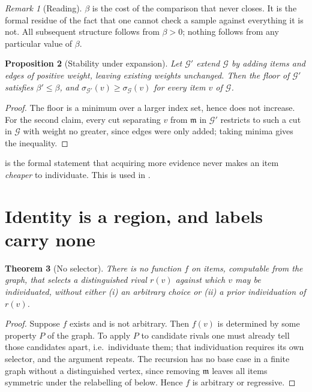 \documentclass[11pt,a4paper]{article}
\newtheorem{theorem}{Theorem}[section]
\newtheorem{proposition}[theorem]{Proposition}
\theoremstyle{definition}
\theoremstyle{remark}
\newtheorem{remark}[theorem]{Remark}
\newcommand{\Gph}{\mathcal{G}}              %
\newcommand{\med}{\mathfrak{m}}              %
\newcommand{\flo}{\beta}                     %
\newcommand{\sep}{\sigma}                    %
\begin{document}
\begin{remark}[Reading]
\label{rem:floor-reading}
$\flo$ is the cost of the comparison that never closes. It is the
formal residue of the fact that one cannot check a sample against
everything it is not. All subsequent structure follows from
$\flo>0$; nothing follows from any particular value of $\flo$.
\end{remark}

\begin{proposition}[Stability under expansion]
\label{prop:stability}
Let $\Gph'$ extend $\Gph$ by adding items and edges of positive weight,
leaving existing weights unchanged. Then the floor of $\Gph'$ satisfies
$\flo'\le\flo$, and $\sep_{\Gph'}(v)\ge\sep_{\Gph}(v)$ for every item $v$
of $\Gph$.
\end{proposition}

\begin{proof}
The floor is a minimum over a larger index set, hence does not increase.
For the second claim, every cut separating $v$ from $\med$ in $\Gph'$
restricts to such a cut in $\Gph$ with weight no greater, since edges
were only added; taking minima gives the inequality.
\end{proof}

 is the formal statement that acquiring more
evidence never makes an item \emph{cheaper} to individuate. This is used
in .

\section{Identity is a region, and labels carry none}
\label{sec:identity}

\begin{theorem}[No selector]
\label{thm:no-selector}
There is no function $f$ on items, computable from the graph, that
selects a distinguished rival $r(v)$ against which $v$ may be
individuated, without either (i) an arbitrary choice or (ii) a prior
individuation of $r(v)$.
\end{theorem}

\begin{proof}
Suppose $f$ exists and is not arbitrary. Then $f(v)$ is determined by
some property $P$ of the graph. To apply $P$ to candidate rivals one must
already tell those candidates apart, i.e.\ individuate them; that
individuation requires its own selector, and the argument repeats. The
recursion has no base case in a finite graph without a distinguished
vertex, since removing $\med$ leaves all items symmetric under the
relabelling of  below. Hence $f$ is arbitrary or
regressive.
\end{proof}
\end{document}
